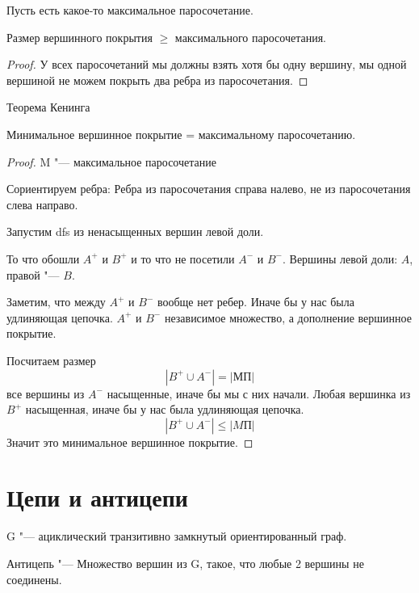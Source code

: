 \begin{theorem}{}
Пусть есть какое-то максимальное паросочетание. 

Размер вершинного покрытия $\ge$ максимального паросочетания. 
\end{theorem}
\begin{proof}

У всех паросочетаний мы должны взять хотя бы одну вершину, мы одной вершиной не можем покрыть два ребра из паросочетания. 

\end{proof}

\begin{theorem}{Теорема Кенинга}

Минимальное вершинное покрытие = максимальному паросочетанию.     

\end{theorem}

\begin{proof}
  
M "--- максимальное паросочетание

Сориентируем ребра: Ребра из паросочетания справа налево, не из паросочетания слева направо.

Запустим dfs из ненасыщенных вершин левой доли. 

То что обошли $A^+$ и $B^+$ и то что не посетили $A^{-}$ и $B^-$. Вершины левой доли: $A$, правой "---  $B$. 

Заметим, что между $A^{+}$ и $B^{-}$ вообще нет ребер. Иначе бы у нас была удлиняющая цепочка.
$A^{+}$ и $B^{-}$ независимое множество, а дополнение вершинное покрытие.

Посчитаем размер $$|B^+ \cup A^{-}| = |МП|$$ все вершины из $A^-$ насыщенные, иначе бы мы с них начали. Любая вершинка из $B^{+}$
насыщенная, иначе бы у нас была удлиняющая цепочка. $$|B^+ \cup A^-|\le |MП|$$ Значит это минимальное вершинное покрытие.

\end{proof}

\section{Цепи и антицепи}


G "--- ациклический транзитивно замкнутый ориентированный граф.

\begin{Def}
Антицепь "--- Множество вершин из G, такое, что любые 2 вершины не соединены.
\end{Def}
                                                                 
